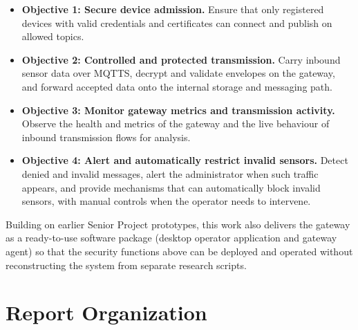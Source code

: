 \documentclass[12pt,a4paper]{report}
\begin{document}
\begin{itemize}
    \item \textbf{Objective 1: Secure device admission.}
    Ensure that only registered devices with valid
    credentials and certificates can connect and publish
    on allowed topics.

    \item \textbf{Objective 2: Controlled and protected
    transmission.}
    Carry inbound sensor data over MQTTS, decrypt and
    validate envelopes on the gateway, and forward
    accepted data onto the internal storage and messaging
    path.

    \item \textbf{Objective 3: Monitor gateway metrics and
    transmission activity.}
    Observe the health and metrics of the gateway and the live behaviour of inbound
    transmission flows for analysis.

    \item \textbf{Objective 4: Alert and automatically
    restrict invalid sensors.}
    Detect denied and invalid messages, alert the
    administrator when such traffic appears, and provide
    mechanisms that can automatically block invalid sensors,
    with manual controls when the operator needs to intervene.
\end{itemize}

Building on earlier Senior Project prototypes, this work
also delivers the gateway as a ready-to-use software
package (desktop operator application and gateway agent)
so that the security functions above can be deployed and
operated without reconstructing the system from separate
research scripts.

\section{Report Organization}
\end{document}
